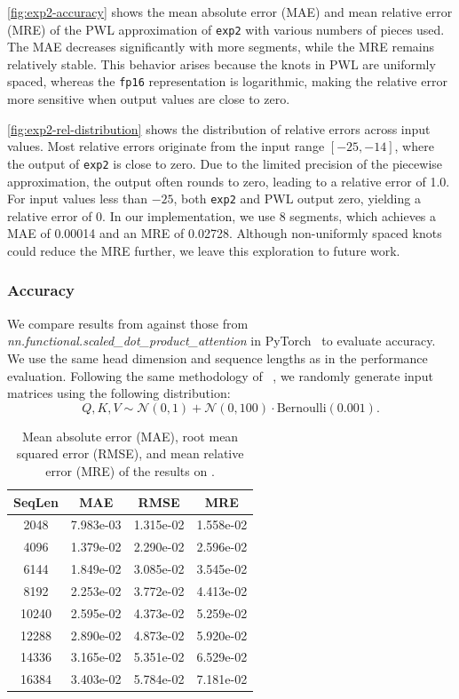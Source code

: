 \autoref{fig:exp2-accuracy} shows the mean absolute error (MAE) and 
mean relative error (MRE) of the PWL approximation of 
\texttt{exp2} with various numbers of pieces used. The MAE decreases 
significantly with more segments, while the MRE remains relatively stable. 
This behavior arises because the knots in PWL are 
uniformly spaced, whereas the \texttt{fp16} representation is logarithmic,
making the relative error more sensitive when output values 
are close to zero.

\autoref{fig:exp2-rel-distribution} shows the distribution of relative 
errors across input values. Most relative errors originate from the input 
range $[-25, -14]$, where the output of \texttt{exp2} is close to zero. 
Due to the limited precision of the piecewise approximation, the output 
often rounds to zero, leading to a relative error of 1.0.
For input values less than $-25$, both \texttt{exp2} and PWL output zero,
yielding a relative error of 0.
In our \MSAGA{} implementation, we use 8 segments, which achieves a 
MAE of 0.00014 and an MRE of 0.02728. Although non-uniformly spaced 
knots could reduce the MRE further, we leave this exploration 
to future work.

\subsubsection{\FA{} Accuracy}

We compare results from \SA{} against those from \textit{nn.functional.scaled\_dot\_\-product\_attention} in PyTorch~\cite{pytorch2} to evaluate \FA{} accuracy.
We use the same head dimension and sequence lengths as in the performance evaluation.
Following the same methodology of \FAthree{}~\cite{fa3}, we randomly generate input matrices using the following distribution:
\[
Q, K, V \sim \mathcal{N}(0, 1) + \mathcal{N}(0, 100) \cdot \mathrm{Bernoulli}(0.001).
\]

\begin{table}[t]
\centering
\caption{Mean absolute error (MAE), root mean squared error (RMSE), and mean relative error (MRE) of the \FA{} results on \MSAGA{}.}
\label{table:overall-accuracy}
\begin{tabular}{cccc}
\toprule
\textbf{SeqLen} & \textbf{MAE} & \textbf{RMSE} & \textbf{MRE} \\
\midrule
2048 & 7.983e-03 & 1.315e-02 & 1.558e-02 \\
4096 & 1.379e-02 & 2.290e-02 & 2.596e-02 \\
6144 & 1.849e-02 & 3.085e-02 & 3.545e-02 \\
8192 & 2.253e-02 & 3.772e-02 & 4.413e-02 \\
10240 & 2.595e-02 & 4.373e-02 & 5.259e-02 \\
12288 & 2.890e-02 & 4.873e-02 & 5.920e-02 \\
14336 & 3.165e-02 & 5.351e-02 & 6.529e-02 \\
16384 & 3.403e-02 & 5.784e-02 & 7.181e-02 \\
\bottomrule
\end{tabular}
\end{table}

